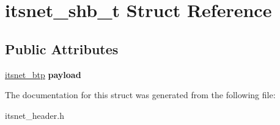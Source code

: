 \hypertarget{structitsnet__shb__t}{\section{itsnet\-\_\-shb\-\_\-t \-Struct \-Reference}
\label{structitsnet__shb__t}
}
\subsection*{\-Public \-Attributes}
\begin{DoxyCompactItemize}
\item 
\hypertarget{structitsnet__shb__t_a10bbfc775a345f288a8a775b4d4f25c0}{\hyperlink{structitsnet__btp}{itsnet\-\_\-btp} {\bfseries payload}}\label{structitsnet__shb__t_a10bbfc775a345f288a8a775b4d4f25c0}

\end{DoxyCompactItemize}


\-The documentation for this struct was generated from the following file\-:\begin{DoxyCompactItemize}
\item 
itsnet\-\_\-header.\-h\end{DoxyCompactItemize}
